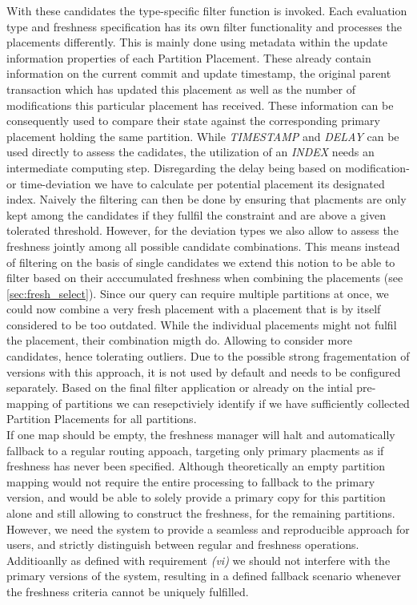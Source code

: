 With these candidates the type-specific filter function is invoked. Each evaluation type and freshness specification has its own filter functionality and
processes the placements differently. This is mainly done using metadata within the update information properties of each Partition Placement. 
These already contain information on the current commit and update timestamp,
the original parent transaction which has updated this placement as well as the number of modifications this particular placement has received.
These information can be consequently used to compare their state against the corresponding primary placement holding the same partition. 
While \emph{TIMESTAMP} and \emph{DELAY} can be used directly to assess the cadidates, the utilization of an \emph{INDEX} needs an intermediate computing step.
Disregarding the delay being based on modification- or time-deviation we have to calculate per potential placement its designated index.
Naively the filtering can then be done by ensuring that placments are only kept among the candidates if they fullfil the constraint and are above 
a given tolerated threshold. However, for the deviation types we also allow to assess the freshness jointly among all possible candidate combinations.
This means instead of filtering on the basis of single candidates we extend this notion to be able to filter based on their acccumulated freshness when combining the placements
(see \ref{sec:fresh_select}).
Since our query can require multiple partitions at once, we could now combine a very fresh placement with a placement that is by itself considered to be too outdated.
While the individual placements might not fulfil the placement, their combination migth do. Allowing to consider more candidates, hence tolerating outliers.
Due to the possible strong fragementation of versions with this approach, it is not used by default and needs to be configured separately.
Based on the final filter application or already on the intial pre-mapping of partitions we can resepctiviely identify if we have sufficiently collected Partition Placements 
for all partitions.\\
If one map should be empty, the freshness manager will halt and automatically fallback to a regular routing appoach, targeting only primary placments 
as if freshness has never been specified.
Although theoretically an empty partition mapping would not require the entire processing to fallback to the primary version, and 
would be able to solely provide a primary copy for this partition alone and still allowing to construct the freshness, 
for the remaining partitions. 
However, we need the system to provide a seamless and reproducible approach for users, and strictly distinguish between regular and freshness operations. 
Additioanlly as defined with requirement \textit{(vi)} we should not interfere with the primary versions of the system, resulting in a defined fallback scenario whenever the freshness
criteria cannot be uniquely fulfilled.




